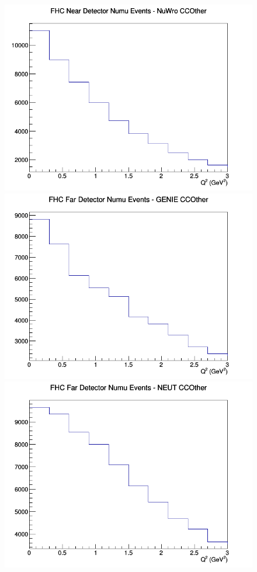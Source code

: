 \documentclass[12pt]{article}
\begin{document}
\begin{figure}[h]
\includegraphics[width=\linewidth]{eff_Q2/LAr/CCOther_FHC_ND_numu_Q2_NuWro.png}
\endminipage
\newline
{}
\includegraphics[width=\linewidth]{eff_Q2/LAr/CCOther_FHC_FD_numu_Q2_GENIE.png}
\endminipage
{}
\includegraphics[width=\linewidth]{eff_Q2/LAr/CCOther_FHC_FD_numu_Q2_NEUT.png}

\end{figure}
\end{document}
